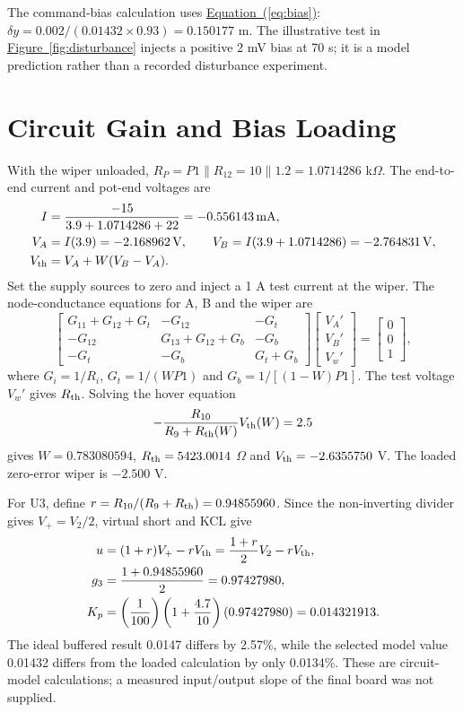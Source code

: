 \documentclass[12pt,a4paper]{article}
\numberwithin{equation}{section}
\newcommand{\page}{\clearpage}
\newcommand{\unit}[1]{\,\mathrm{#1}}
\newcommand{\Fref}[1]{\hyperref[#1]{Figure~\ref*{#1}}}
\newcommand{\Eref}[1]{\hyperref[#1]{Equation~(\ref*{#1})}}
\begin{document}
The command-bias calculation uses \Eref{eq:bias}: $\delta y=0.002/(0.01432\times0.93)=0.150177$ m. The illustrative test in \Fref{fig:disturbance} injects a positive 2 mV bias at 70 s; it is a model prediction rather than a recorded disturbance experiment.
\page

\section{Circuit Gain and Bias Loading}\label{sec:hardware}\label{app:loading}
With the wiper unloaded, $R_P=P1\parallel R_{12}=10\parallel1.2=1.0714286$ k$\Omega$. The end-to-end current and pot-end voltages are
\begin{align}
I&=\frac{-15}{3.9+1.0714286+22}=-0.556143\unit{mA},\\
V_A&=I(3.9)=-2.168962\unit{V},\qquad V_B=I(3.9+1.0714286)=-2.764831\unit{V},\\
V_{\rm th}&=V_A+W(V_B-V_A).
\end{align}
Set the supply sources to zero and inject a 1 A test current at the wiper. The node-conductance equations for A, B and the wiper are
\begin{equation}
\begin{bmatrix}
G_{11}+G_{12}+G_t&-G_{12}&-G_t\\
-G_{12}&G_{13}+G_{12}+G_b&-G_b\\
-G_t&-G_b&G_t+G_b
\end{bmatrix}
\begin{bmatrix}V_A'\\V_B'\\V_w'\end{bmatrix}
=\begin{bmatrix}0\\0\\1\end{bmatrix},
\end{equation}
where $G_i=1/R_i$, $G_t=1/(WP1)$ and $G_b=1/[(1-W)P1]$. The test voltage $V_w'$ gives $R_{\rm th}$. Solving the hover equation
\begin{equation}
-\frac{R_{10}}{R_9+R_{\rm th}(W)}V_{\rm th}(W)=2.5
\end{equation}
gives $W=0.783080594$, $R_{\rm th}=5423.0014$ $\Omega$ and $V_{\rm th}=-2.6355750$ V. The loaded zero-error wiper is $-2.500$ V.

For U3, define $r=R_{10}/(R_9+R_{\rm th})=0.94855960$. Since the non-inverting divider gives $V_+=V_2/2$, virtual short and KCL give
\begin{align}
u&=(1+r)V_+-rV_{\rm th}=\frac{1+r}{2}V_2-rV_{\rm th},\\
g_3&=\frac{1+0.94855960}{2}=0.97427980,\\
K_p&=\left(\frac{1}{100}\right)\left(1+\frac{4.7}{10}\right)(0.97427980)=0.014321913.
\end{align}
The ideal buffered result 0.0147 differs by 2.57\%, while the selected model value 0.01432 differs from the loaded calculation by only 0.0134\%. These are circuit-model calculations; a measured input/output slope of the final board was not supplied.
\page
\end{document}
